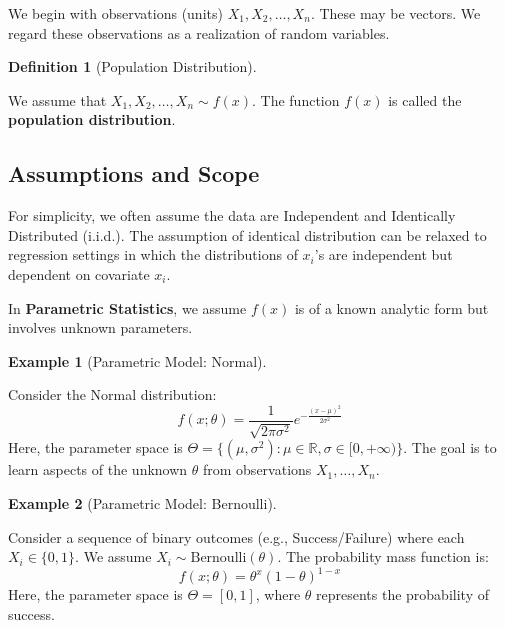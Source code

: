 \documentclass[
  letterpaper,
  DIV=11,
  numbers=noendperiod]{scrreprt}
\renewcommand{\[}{\begin{equation}}
\renewcommand{\]}{\end{equation}}
\theoremstyle{definition}
\newtheorem{definition}{Definition}[chapter]
\theoremstyle{plain}
\theoremstyle{plain}
\theoremstyle{plain}
\theoremstyle{definition}
\newtheorem{example}{Example}[chapter]
\theoremstyle{plain}
\theoremstyle{remark}
\begin{document}
We begin with observations (units) \(X_1, X_2, \dots, X_n\). These may
be vectors. We regard these observations as a realization of random
variables.

\begin{definition}[Population
Distribution]\protect\hypertarget{def-population-distribution}{}\label{def-population-distribution}

We assume that \(X_1, X_2, \dots, X_n \sim f(x)\). The function \(f(x)\)
is called the \textbf{population distribution}.

\end{definition}

\subsection*{Assumptions and Scope}\label{assumptions-and-scope}

For simplicity, we often assume the data are Independent and Identically
Distributed (i.i.d.). The assumption of identical distribution can be
relaxed to regression settings in which the distributions of \(x_i\)'s
are independent but dependent on covariate \(x_i\).

In \textbf{Parametric Statistics}, we assume \(f(x)\) is of a known
analytic form but involves unknown parameters.

\begin{example}[Parametric Model:
Normal]\protect\hypertarget{exm-normal-distribution}{}\label{exm-normal-distribution}

Consider the Normal distribution:
\[f(x; \theta) = \frac{1}{\sqrt{2\pi\sigma^2}} e^{-\frac{(x-\mu)^2}{2\sigma^2}}\]
Here, the parameter space is
\(\Theta = \{ (\mu, \sigma^2) : \mu \in \mathbb{R}, \sigma \in [0, +\infty) \}\).
The goal is to learn aspects of the unknown \(\theta\) from observations
\(X_1, \dots, X_n\).

\end{example}

\begin{example}[Parametric Model:
Bernoulli]\protect\hypertarget{exm-bernoulli-distribution}{}\label{exm-bernoulli-distribution}

Consider a sequence of binary outcomes (e.g., Success/Failure) where
each \(X_i \in \{0, 1\}\). We assume
\(X_i \sim \text{Bernoulli}(\theta)\). The probability mass function is:
\[f(x; \theta) = \theta^x (1-\theta)^{1-x}\] Here, the parameter space
is \(\Theta = [0, 1]\), where \(\theta\) represents the probability of
success.

\end{example}
\end{document}
